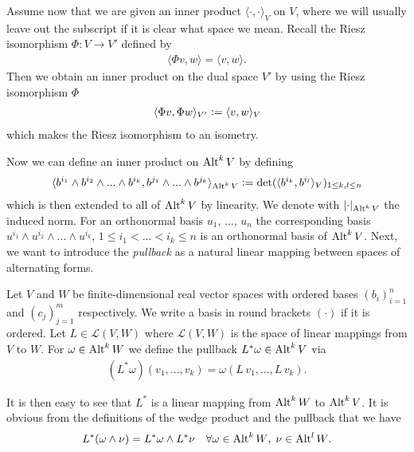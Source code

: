 \documentclass[../master_thesis.tex]{subfiles}
\begin{document}
Assume now that we are given an inner product $\langle \cdot, \cdot \rangle_V$ on $V$, 
where we will usually leave out the 
subscript if it is clear what space we mean.
Recall the Riesz isomorphism $\Phi: V \rightarrow V'$ defined by
\begin{align*}
   \langle \Phi v, w \rangle = \langle v, w \rangle.
\end{align*}
Then we obtain an inner 
product on the dual space $V'$ by using the Riesz isomorphism $\Phi$ 
\begin{align*}
    \langle \Phi v, \Phi w \rangle_{V'} \vcentcolon= \langle v, w \rangle_V
\end{align*}
which makes the Riesz isomorphism to an isometry.

Now we can define an inner product on ${\text{Alt}^{k}\,V}$ by defining
\begin{align}
    \langle b^{i_1} \wedge b^{i_2} \wedge... \wedge b^{i_k}, 
    b^{j_1} \wedge... \wedge b^{j_k} \rangle_{{\text{Alt}^{k}\,V}} 
    \vcentcolon= \det  ( \langle b^{i_k}, b^{i_l} \rangle_V )_
    {1\leq k,l \leq n} \label{eq:inner_product_alternating_forms}
\end{align}
which is then extended to all of ${\text{Alt}^{k}\,V}$ by linearity. 
We denote with $\lvert \cdot \rvert _{\text{Alt}^{k}\,V}$ the induced norm.
For an orthonormal basis 
$u_1$, ..., $u_n$ the corresponding basis 
$u^{i_1} \wedge u^{i_2} \wedge ... \wedge u^{i_k}$, 
$1\leq i_1 < ... < i_k \leq n$ is an orthonormal basis of ${\text{Alt}^{k}\,V}$.
Next, we want to introduce the \textit{pullback} as a natural linear
mapping between spaces of alternating forms. 

\begin{definition}
    Let $V$ and $W$ be finite-dimensional real
    vector spaces with ordered bases $(b_i)_{i=1}^n$ and $(c_j)_{j=1}^m$ 
    respectively. We write a basis in round brackets $(\cdot)$ if it is 
    ordered. Let $L \in \mathcal{L}(V,W)$ where $\mathcal{L}(V,W)$ is the 
    space of linear mappings from $V$ to $W$. For $\omega \in {\text{Alt}^{k}\,W}$
    we define the pullback $L^* \omega \in {\text{Alt}^{k}\,V}$ via 
    \begin{align*}
        (L^* \omega)(v_1,...,v_k) = \omega(L\,v_1,...,L\,v_k).
    \end{align*} 
\end{definition}
It is then easy to see that 
$L^*$ is a linear mapping from ${\text{Alt}^{k}\,W}$ to 
${\text{Alt}^{k}\,V}$.
It is obvious from the definitions of the wedge product and 
the pullback that we have 
\begin{align*}
    L^*(\omega \wedge \nu) = L^*\omega \wedge L^* \nu \quad \forall 
        \omega \in {\text{Alt}^{k}\,W}, \; \nu \in {\text{Alt}^{l}\,W}.
\end{align*}
\end{document}
